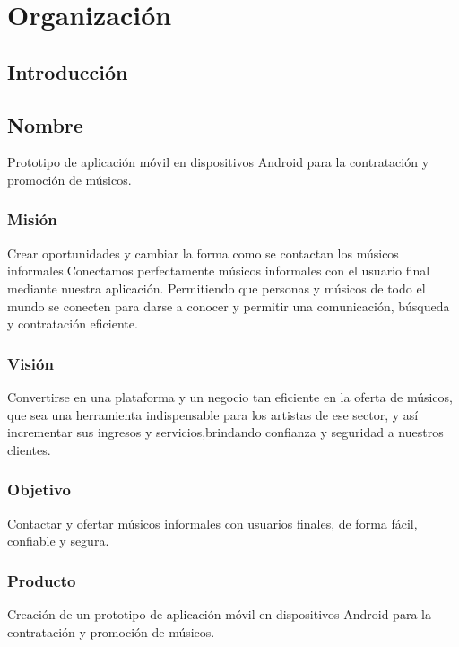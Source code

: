 \chapter{Organización}

\section{Introducción}

\section{Nombre}
Prototipo de aplicación móvil en dispositivos Android para la contratación y promoción de músicos.
\subsection{Misión}
Crear oportunidades y cambiar la forma como se contactan los músicos informales.Conectamos perfectamente músicos informales con el usuario final mediante nuestra aplicación. Permitiendo que personas y músicos de todo el mundo se conecten para darse a conocer y permitir una comunicación, búsqueda y contratación eficiente.
\subsection{Visión}
Convertirse en una plataforma y un negocio tan eficiente en la oferta de músicos, que sea una herramienta indispensable para los artistas de ese sector, y así incrementar sus ingresos y servicios,brindando confianza y seguridad a nuestros clientes.
\subsection{Objetivo}
Contactar y ofertar músicos informales con usuarios finales, de forma fácil, confiable y segura.
\subsection{Producto}
Creación de un prototipo de aplicación móvil en dispositivos Android para la contratación y promoción de músicos.

